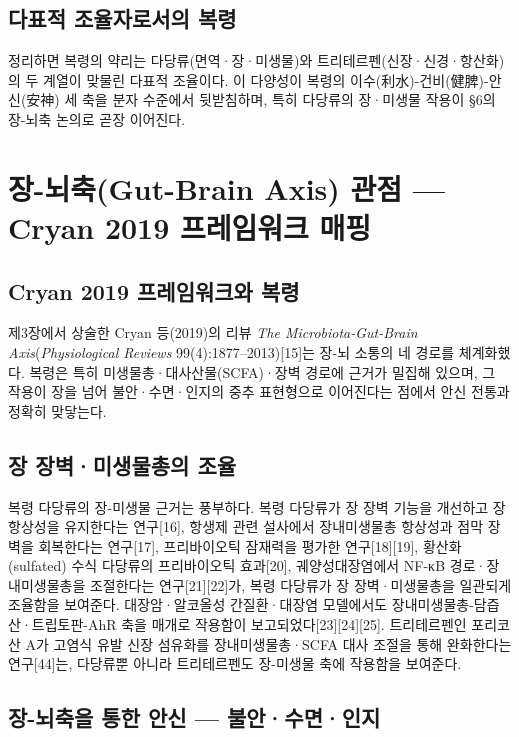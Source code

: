 \documentclass[12pt,oneside]{book}
\begin{document}
\subsection{다표적 조율자로서의 복령}

정리하면 복령의 약리는 다당류(면역·장·미생물)와 트리테르펜(신장·신경·항산화)의 두 계열이 맞물린 다표적 조율이다. 이 다양성이 복령의 이수(利水)-건비(健脾)-안신(安神) 세 축을 분자 수준에서 뒷받침하며, 특히 다당류의 장·미생물 작용이 §6의 장-뇌축 논의로 곧장 이어진다.

\section{장-뇌축(Gut-Brain Axis) 관점 — Cryan 2019 프레임워크 매핑}

\subsection{Cryan 2019 프레임워크와 복령}

제3장에서 상술한 Cryan 등(2019)의 리뷰 \textit{The Microbiota-Gut-Brain Axis}(\textit{Physiological Reviews} 99(4):1877–2013)[15]는 장-뇌 소통의 네 경로를 체계화했다. 복령은 특히 미생물총·대사산물(SCFA)·장벽 경로에 근거가 밀집해 있으며, 그 작용이 장을 넘어 불안·수면·인지의 중추 표현형으로 이어진다는 점에서 안신 전통과 정확히 맞닿는다.

\subsection{장 장벽·미생물총의 조율}

복령 다당류의 장-미생물 근거는 풍부하다. 복령 다당류가 장 장벽 기능을 개선하고 장 항상성을 유지한다는 연구[16], 항생제 관련 설사에서 장내미생물총 항상성과 점막 장벽을 회복한다는 연구[17], 프리바이오틱 잠재력을 평가한 연구[18][19], 황산화(sulfated) 수식 다당류의 프리바이오틱 효과[20], 궤양성대장염에서 NF-κB 경로·장내미생물총을 조절한다는 연구[21][22]가, 복령 다당류가 장 장벽·미생물총을 일관되게 조율함을 보여준다. 대장암·알코올성 간질환·대장염 모델에서도 장내미생물총-담즙산·트립토판-AhR 축을 매개로 작용함이 보고되었다[23][24][25]. 트리테르펜인 포리코산 A가 고염식 유발 신장 섬유화를 장내미생물총·SCFA 대사 조절을 통해 완화한다는 연구[44]는, 다당류뿐 아니라 트리테르펜도 장-미생물 축에 작용함을 보여준다.

\subsection{장-뇌축을 통한 안신 — 불안·수면·인지}
\end{document}

